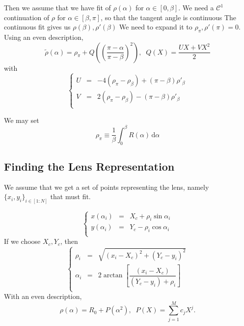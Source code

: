 \documentclass[aps,onecolumn]{revtex4}
\begin{document}
Then we assume that we have fit of $\rho(\alpha)$ for $\alpha\in[0,\beta]$.
We need a $\mathcal{C}^1$ continuation of $\rho$ for $\alpha\in[\beta,\pi]$, so
that the tangent angle is continuous
The continuous fit gives us $\rho(\beta),\rho'(\beta)$
We need to expand it to $\rho_\pi,\rho'(\pi)=0$.
Using an even description,
\begin{equation}
	\tilde{\rho}(\alpha) = \rho_\pi + Q\left( \left(\dfrac{\pi-\alpha}{\pi-\beta}\right)^2 \right)
	, \;\; Q(X) = \dfrac{UX+VX^2}{2}
\end{equation}
with
\begin{equation}
\left\lbrace
	\begin{array}{rcl}
	U & = & -4\left(\rho_\pi-\rho_\beta\right)+\left(\pi-\beta\right) \rho'_\beta\\
	V & = & 2\left(\rho_\pi-\rho_\beta\right)-\left(\pi-\beta\right) \rho'_\beta \\
	\end{array}
\right.
\end{equation}

We may set 
\begin{equation}
	\rho_\pi \equiv \dfrac{1}{\beta}\int_0^\beta R(\alpha)\,\mathrm{d}\alpha
\end{equation}

\subsection{Finding the Lens Representation}
We assume that we get a set of points representing the lens, namely $\lbrace x_i,y_i \rbrace_{i\in[1:N]}$ that must
fit.

\begin{equation}
	\left\lbrace
		\begin{array}{rcl}
	x(\alpha_i) & = & X_c + \rho_i\sin\alpha_i\\
	y(\alpha_i) & = & Y_c - \rho_i\cos\alpha_i\\
		\end{array}
	\right.
\end{equation}
If we choose $X_c,Y_c$, then
\begin{equation}
	\left\lbrace
	\begin{array}{rcl}	
	\rho_i   &=&\sqrt{\left(x_i-X_c\right)^2+\left(Y_c-y_i\right)^2}\\
	\alpha_i &=& 2 \arctan\left[ \dfrac{\left(x_i-X_c\right)}{\left(Y_c-y_i\right)+\rho_i}\right]\\
	\end{array}
	\right.
\end{equation}
With an even description,
\begin{equation}
	\rho(\alpha) = R_0 + P(\alpha^2),\;\; P(X) = \sum_{j=1}^{M} c_j X^j.
\end{equation}
\end{document}
